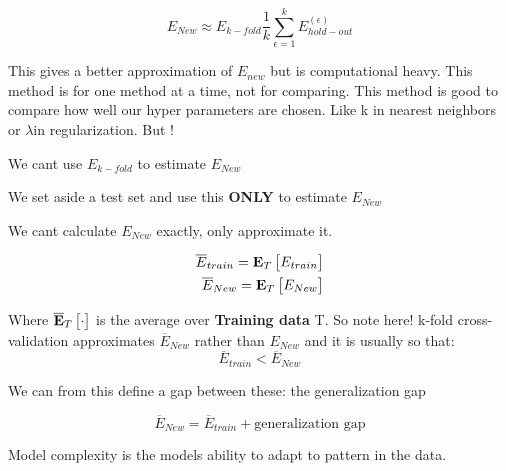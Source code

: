 \begin{equation}
E_{New} \approx E_{k-fold} \frac{1} {k} \sum_{\epsilon = 1}^{k} E^{(\epsilon)}_{hold-out}
\end{equation}

This gives a better approximation of $E_{new}$ but is computational heavy. This method is for one method at a time, not for comparing. This method is good to compare how well our hyper parameters are chosen. Like k in nearest neighbors or $\lambda$in regularization. But !

\begin{definition}{}
We cant use $E_{k-fold}$ to estimate $E_{New}$
\end{definition}
\begin{example}{}
We set aside a test set and use this \textbf{ONLY} to estimate $E_{New}$
\end{example}	


We cant calculate $E_{New}$ exactly, only approximate it. 

\begin{equation}
\begin{aligned}
\overline{E}_{train} = \text{\textbf{E}}_T \begin{bmatrix} E_{train} \end{bmatrix} \\
\overline{E}_{New} = \text{\textbf{E}}_T \begin{bmatrix} E_{New} \end{bmatrix}
\end{aligned}
\end{equation}

Where $\overline{\text{\textbf{E}}}_T \begin{bmatrix} \cdot \end{bmatrix}$ is the average over \textbf{Training data} T. So note here! k-fold cross-validation approximates $\overline{E}_{New}$ rather than $E_{New}$ and it is usually so that:
\begin{equation}
\overline{E}_{train} < \overline{E}_{New}
\end{equation}

We can from this define a gap between these: the generalization gap

\begin{equation}
\overline{E}_{New} = \overline{E}_{train} + \text{generalization gap}
\end{equation}

\begin{example}{}
Model complexity is the models ability to adapt to pattern in the data.
\end{example}	

